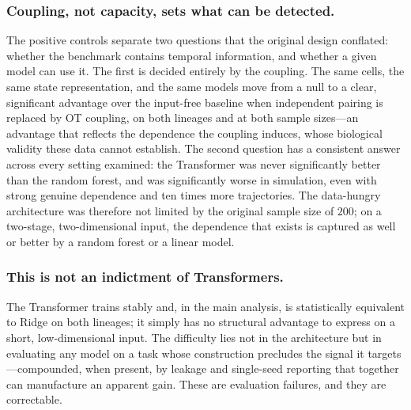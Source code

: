 \documentclass[pdflatex,sn-mathphys-num]{sn-jnl}
\theoremstyle{thmstyleone}%
\theoremstyle{thmstyletwo}%
\theoremstyle{thmstylethree}%
\begin{document}
\subsubsection{Coupling, not capacity, sets what can be detected.} The positive controls separate two questions that the original design conflated: whether the benchmark contains temporal information, and whether a given model can use it. The first is decided entirely by the coupling. The same cells, the same state representation, and the same models move from a null to a clear, significant advantage over the input-free baseline when independent pairing is replaced by OT coupling, on both lineages and at both sample sizes---an advantage that reflects the dependence the coupling induces, whose biological validity these data cannot establish. The second question has a consistent answer across every setting examined: the Transformer was never significantly better than the random forest, and was significantly worse in simulation, even with strong genuine dependence and ten times more trajectories. The data-hungry architecture was therefore not limited by the original sample size of $200$; on a two-stage, two-dimensional input, the dependence that exists is captured as well or better by a random forest or a linear model.

\subsubsection{This is not an indictment of Transformers.} The Transformer trains stably and, in the main analysis, is statistically equivalent to Ridge on both lineages; it simply has no structural advantage to express on a short, low-dimensional input. The difficulty lies not in the architecture but in evaluating any model on a task whose construction precludes the signal it targets---compounded, when present, by leakage and single-seed reporting that together can manufacture an apparent gain. These are evaluation failures, and they are correctable.
\end{document}
